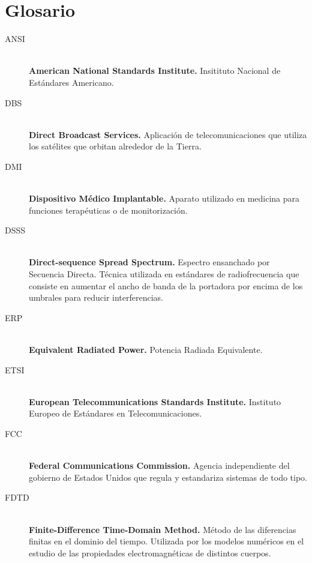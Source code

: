 \chapter{\textbf{Glosario}}

\begin{description}

    \item[ANSI]\mbox{}\\
    \textbf{American National Standards Institute.} Insitituto Nacional de Estándares Americano.

    \item[DBS]\mbox{}\\
    \textbf{Direct Broadcast Services.} Aplicación de telecomunicaciones que utiliza los satélites que orbitan alrededor de la Tierra.

    \item[DMI]\mbox{}\\
    \textbf{Dispositivo Médico Implantable.} Aparato utilizado en medicina para funciones terapéuticas o de monitorización.

    \item[DSSS]\mbox{}\\
    \textbf{Direct-sequence Spread Spectrum.} Espectro ensanchado por Secuencia Directa. Técnica utilizada en estándares de radiofrecuencia que consiste en aumentar el ancho de banda de la portadora por encima de los umbrales para reducir interferencias.

    \item[ERP]\mbox{}\\
    \textbf{Equivalent Radiated Power.} Potencia Radiada Equivalente.

    \item[ETSI]\mbox{}\\
    \textbf{European Telecommunications Standards Institute.} Instituto Europeo de Estándares en Telecomunicaciones.

    \item[FCC]\mbox{}\\
    \textbf{Federal Communications Commission.} Agencia independiente del gobierno de Estados Unidos que regula y estandariza sistemas de todo tipo.

    \item[FDTD]\mbox{}\\
    \textbf{Finite-Difference Time-Domain Method.} Método de las diferencias finitas en el dominio del tiempo. Utilizada por los modelos numéricos en el estudio de las propiedades electromagnéticas de distintos cuerpos.


\end{description}
